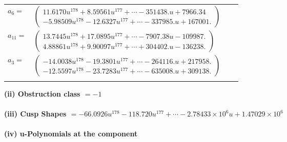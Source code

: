 \documentclass[1p]{elsarticle_modified}
\theoremstyle{definition}
\begin{document}
\begin{tabular}{m{7pt} m{180pt} m{7pt} m{180pt} }
\flushright $a_{6}=$&$\begin{pmatrix}11.6170 u^{178}+8.59561 u^{177}+\cdots-351438. u+7966.34\\-5.98509 u^{178}-12.6327 u^{177}+\cdots-337985. u+167001.\end{pmatrix}$ \\
\flushright $a_{11}=$&$\begin{pmatrix}13.7445 u^{178}+17.0895 u^{177}+\cdots-7907.38 u-109987.\\4.88861 u^{178}+9.90097 u^{177}+\cdots+304402. u-136238.\end{pmatrix}$ \\
\flushright $a_{3}=$&$\begin{pmatrix}-14.0038 u^{178}-19.3801 u^{177}+\cdots-264116. u+217958.\\-12.5597 u^{178}-23.7283 u^{177}+\cdots-635008. u+309138.\end{pmatrix}$\\&\end{tabular}
\flushleft \textbf{(ii) Obstruction class $= -1$}\\~\\
\flushleft \textbf{(iii) Cusp Shapes $= -66.0926 u^{178}-118.720 u^{177}+\cdots-2.78433\times10^{6} u+1.47029\times10^{6}$}\\~\\
\newpage\renewcommand{\arraystretch}{1}
\flushleft \textbf{(iv) u-Polynomials at the component}\newline \\
\end{document}
